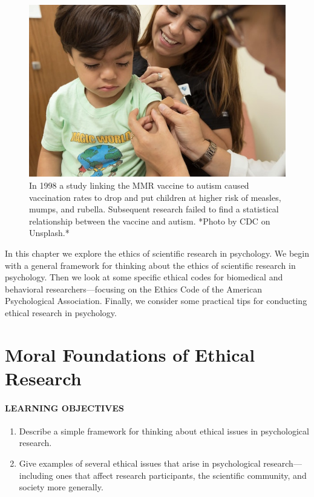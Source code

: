 \documentclass[
]{krantz}
\providecommand{\tightlist}{%
  \setlength{\itemsep}{0pt}\setlength{\parskip}{0pt}}
\begin{document}
\begin{figure}

{\centering \includegraphics[width=0.5\linewidth]{images/ethics/vaccine} 

}

\caption{In 1998 a study linking the MMR vaccine to autism caused vaccination rates to drop and put children at higher risk of measles, mumps, and rubella. Subsequent research failed to find a statistical relationship between the vaccine and autism. *Photo by CDC on Unsplash.*}\label{fig:vaccine}
\end{figure}

In this chapter we explore the ethics of scientific research in psychology. We begin with a general framework for thinking about the ethics of scientific research in psychology. Then we look at some specific ethical codes for biomedical and behavioral researchers---focusing on the Ethics Code of the American Psychological Association. Finally, we consider some practical tips for conducting ethical research in psychology.

\hypertarget{moral-foundations-of-ethical-research}{%
\section{Moral Foundations of Ethical Research}\label{moral-foundations-of-ethical-research}}

\hypertarget{learning-objectives-9}{%
\paragraph*{LEARNING OBJECTIVES}\label{learning-objectives-9}}

\begin{enumerate}
\def\labelenumi{\arabic{enumi}.}
\tightlist
\item
  Describe a simple framework for thinking about ethical issues in psychological research.
\item
  Give examples of several ethical issues that arise in psychological research---including ones that affect research participants, the scientific community, and society more generally.
\end{enumerate}
\end{document}
